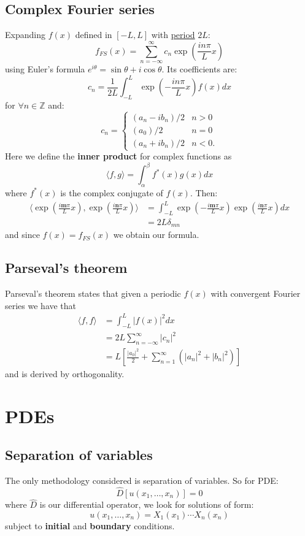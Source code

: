 \documentclass{article}
\begin{document}
\subsection{Complex Fourier series}
Expanding $f(x)$ defined in $[-L,L]$ with \underline{period} $2L$:
$$f_{FS}(x)=\sum_{n=-\infty}^{\infty} c_n \exp\left(\frac{in\pi}{L} x\right)$$
using Euler's formula $e^{i\theta}=\sin{\theta}+i\cos{\theta}$. Its coefficients are:
$$c_n=\frac{1}{2L}\int_{-L}^{L} \exp\left(-\frac{in\pi}{L} x\right) f(x)dx$$
for $\forall n \in \mathbb{Z}$ and:
\[ c_n = \begin{cases} 
    (a_n - ib_n)/2 & n > 0 \\
    (a_0)/2 & n = 0 \\
    (a_n + ib_n)/2 & n < 0.
\end{cases}\]
 Here we define the \textbf{inner product} for complex functions as
$$\langle f, g\rangle=\int_{\alpha}^{\beta} f^*(x)g(x) dx$$
where $f^*(x)$ is the complex conjugate of $f(x)$. Then:
\begin{align*}
    \langle \exp\left(\frac{i\boldsymbol{m}\pi}{L} x\right), \exp\left(\frac{i\boldsymbol{n}\pi}{L} x\right)\rangle
    &=\int_{-L}^{L} \exp\left(-\frac{i\boldsymbol{m}\pi}{L} x\right) \exp\left(\frac{i\boldsymbol{n}\pi}{L} x\right)dx \\
    &= 2L\delta_{mn}
\end{align*}
and since $f(x)=f_{FS}(x)$ we obtain our formula.

\subsection{Parseval's theorem}
Parseval's theorem states that given a periodic $f(x)$ with convergent Fourier series
we have that
\begin{align*}
    \langle f, f\rangle
    &=\int_{-L}^{L} |f(x)|^2 dx \\
    &=2L\sum_{n=-\infty}^{\infty} |c_n|^2 \\
    &=L\left[ \frac{|a_0|^2}{2} + \sum_{n=1}^{\infty} (|a_n|^2 + |b_n|^2)\right]
\end{align*}
and is derived by orthogonality.

\newpage

\section{PDEs}

\subsection{Separation of variables}
The only methodology considered is separation of variables. So for PDE:
$$\hat{D}[u(x_1,\dots,x_n)]=0$$
where $\hat{D}$ is our differential operator, we look for solutions of form:
$$u(x_1,\dots,x_n)=X_1(x_1)\cdots X_n(x_n)$$
subject to \textbf{initial} and \textbf{boundary} conditions.
\end{document}

